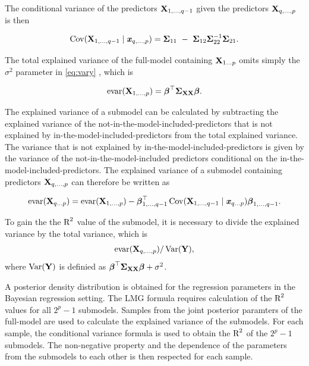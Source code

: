\documentclass[11pt,a4paper,twoside]{book}\usepackage[]{graphicx}\usepackage[]{color}
\begin{document}
 The conditional variance of the predictors $ {\mathbf{X}}_{1 ,\dotsc, q-1} $ given the predictors  $ {\mathbf{X}}_{q ,\dotsc, p} $ is then
 
          \begin{align*} 
 \cov(\X_{1,\dotsc, q-1} \mid \x_{q ,\dotsc, p}) = \bSigma_{11}\ -\ \bSigma_{12} \bSigma_{22}^{-1}\bSigma_{21} .
       \end{align*}
       
       The total explained variance of the full-model containing ${\mathbf{X}}_{1 \dots p}$ omits simply the $\sigma^2$ parameter in \eqref{eq:vary} , which is

      \begin{align*} 
        \text{evar}({\mathbf{X}}_{1 ,\dotsc, p}) = {\boldsymbol{\beta}}^\top {\boldsymbol{\Sigma}}{}_{{\mathbf{X}} {\mathbf{X}}}  {\boldsymbol{\beta}}. 
   \end{align*}

The explained variance of a submodel can be calculated by subtracting the explained variance of the not-in-the-model-included-predictors that is not explained by in-the-model-included-predictors from the total explained variance. The variance that is not explained by in-the-model-included-predictors is given by the variance of the not-in-the-model-included predictors conditional on the in-the-model-included-predictors. The explained variance of a submodel containing predictors ${\mathbf{X}}_{q ,\dotsc, p}$ can therefore be written as

       \begin{align} 
       \text{evar}({\mathbf{X}}_{q \dots p}) =  \text{evar}({\mathbf{X}}_{1  ,\dotsc, p}) - {\boldsymbol{\beta}}^\top_{1 ,\dotsc, q-1} \operatorname{Cov}({\mathbf{X}}_{1,\dotsc, {q-1}} \mid {\textbf{\textit{x}}}_{q \dots p}) {\boldsymbol{\beta}}_{1 ,\dotsc, {q-1}} . \label{eq:varsub} 
   \end{align}

To gain the the $\text{R}^2$ value of the submodel, it is necessary to divide the explained variance by the total variance, which is
       \begin{align*} 
\text{evar}({\mathbf{X}}_{q ,\dotsc, p}) / \operatorname{Var}({\mathbf{Y}}),   
\end{align*}
where $\operatorname{Var}({\mathbf{Y}})$ is definied as  ${\boldsymbol{\beta}}^\top {\boldsymbol{\Sigma}}{}_{{\mathbf{X}} {\mathbf{X}}}  {\boldsymbol{\beta}} + \sigma^2$.

A posterior density distribution is obtained for the regression parameters in the Bayesian regression setting. The LMG formula requires calculation of the $\text{R}^2$ values for all $2^p-1$ submodels. Samples from the joint posterior paramters of the full-model are used to calculate the explained variance of the  submodels. For each sample, the  conditional variance formula is used to obtain the $\text{R}^2$ of the $2^p-1$ submodels. The non-negative property and the dependence of the parameters from the submodels to each other is then respected for each sample. 
\end{document}
